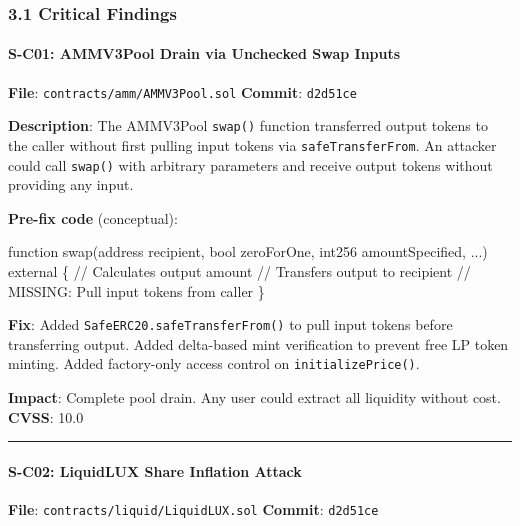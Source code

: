 \documentclass[
]{article}
\newenvironment{Shaded}{}{}
\newcommand{\NormalTok}[1]{#1}
\begin{document}
\subsubsection{3.1 Critical Findings}\label{31-critical-findings}

\paragraph{S-C01: AMMV3Pool Drain via Unchecked Swap
Inputs}\label{s-c01-ammv3pool-drain-via-unchecked-swap-inputs}

\textbf{File}: \texttt{contracts/amm/AMMV3Pool.sol} \textbf{Commit}:
\texttt{d2d51ce}

\textbf{Description}: The AMMV3Pool \texttt{swap()} function transferred
output tokens to the caller without first pulling input tokens via
\texttt{safeTransferFrom}. An attacker could call \texttt{swap()} with
arbitrary parameters and receive output tokens without providing any
input.

\textbf{Pre-fix code} (conceptual):

\begin{Shaded}
\begin{Highlighting}[]
\NormalTok{function swap(address recipient, bool zeroForOne, int256 amountSpecified, ...) external \{}
\NormalTok{    // Calculates output amount}
\NormalTok{    // Transfers output to recipient}
\NormalTok{    // MISSING: Pull input tokens from caller}
\NormalTok{\}}
\end{Highlighting}
\end{Shaded}

\textbf{Fix}: Added \texttt{SafeERC20.safeTransferFrom()} to pull input
tokens before transferring output. Added delta-based mint verification
to prevent free LP token minting. Added factory-only access control on
\texttt{initializePrice()}.

\textbf{Impact}: Complete pool drain. Any user could extract all
liquidity without cost. \textbf{CVSS}: 10.0

\begin{center}\rule{0.5\linewidth}{0.5pt}\end{center}

\paragraph{S-C02: LiquidLUX Share Inflation
Attack}\label{s-c02-liquidlux-share-inflation-attack}

\textbf{File}: \texttt{contracts/liquid/LiquidLUX.sol} \textbf{Commit}:
\texttt{d2d51ce}
\end{document}
